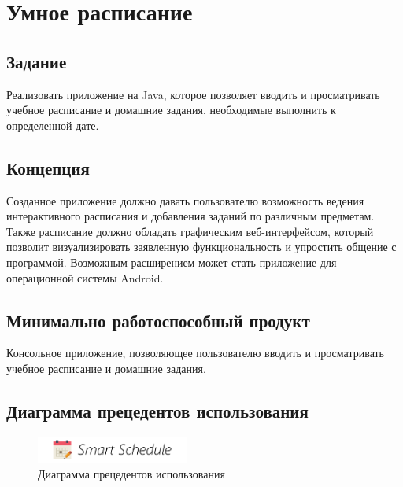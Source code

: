 


\tableofcontents
\newpage



\section{Умное расписание}

\subsection{Задание}

Реализовать приложение на Java, которое позволяет вводить и просматривать учебное расписание и домашние задания, необходимые выполнить к определенной дате.

\subsection{Концепция}

Созданное приложение должно давать пользователю возможность ведения интерактивного расписания и добавления заданий по различным предметам. Также расписание должно обладать графическим веб-интерфейсом, который позволит визуализировать заявленную функциональность и упростить общение с программой. Возможным расширением может стать приложение для операционной системы Android.

\subsection{Минимально работоспособный продукт}

Консольное приложение, позволяющее пользователю вводить и просматривать учебное расписание и домашние задания.

\subsection{Диаграмма прецедентов использования}

\begin{figure}[H]
	\begin{center}
		\includegraphics[width=5cm]{pics/logo}
		\caption{Диаграмма прецедентов использования} 
		\label{pic:use_case_diagram} %
	\end{center}
\end{figure}

